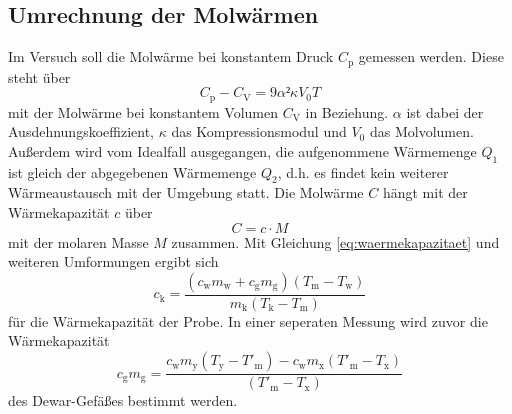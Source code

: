 \subsection{Umrechnung der Molwärmen}
Im Versuch soll die Molwärme bei konstantem Druck $C_\mathup{p}$ gemessen werden. 
Diese steht über
\begin{equation}
	C_\mathup{p}-C_\mathup{V}=9{\alpha}²\kappa V_0 T
	\label{alphakappalpha}
\end{equation}
mit der Molwärme bei konstantem Volumen $C_\mathup{V}$ in Beziehung. 
$\alpha$ ist dabei der Ausdehnungskoeffizient, $\kappa$ das Kompressionsmodul und $V_0$ das Molvolumen.
Außerdem wird vom Idealfall ausgegangen, die aufgenommene Wärmemenge $Q_1$ ist gleich der abgegebenen Wärmemenge $Q_2$, d.h. 
es findet kein weiterer Wärmeaustausch mit der Umgebung statt.
Die Molwärme $C$ hängt mit der Wärmekapazität $c$ über 
\begin{equation}
	C=c\cdot M
	\label{eq:win}
\end{equation}
mit der molaren Masse $M$ zusammen.
Mit Gleichung \eqref{eq:waermekapazitaet} und weiteren Umformungen ergibt sich
\begin{equation}
	c_\mathup{k}=\frac{(c_\mathup{w}m_\mathup{w}+c_\mathup{g}m_\mathup{g})(T_\mathup{m}-T_\mathup{w})}{m_\mathup{k}(T_\mathup{k}-T_\mathup{m})}
	\label{c_Probe}
\end{equation}
für die Wärmekapazität der Probe. 
In einer seperaten Messung wird zuvor die Wärmekapazität 
\begin{equation}
	c_\mathup{g}m_\mathup{g}=\frac{c_\mathup{w}m_\mathup{y}(T_\mathup{y}-T'_\mathup{m})-c_\mathup{w}m_\mathup{x}(T'_\mathup{m}-T_\mathup{x})}{(T'_\mathup{m}-T_\mathup{x})}
	\label{c_Dewar}
\end{equation}
des Dewar-Gefäßes bestimmt werden. 

